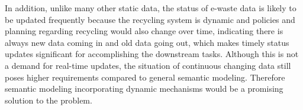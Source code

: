\documentclass{article}
\numberwithin{equation}{section}
\begin{document}
In addition, unlike many other static data, the status of e-waste data is likely to be updated frequently because the recycling system is dynamic and policies and planning regarding recycling would also change over time, indicating there is always new data coming in and old data going out, which makes timely status updates significant for accomplishing the downstream tasks. Although this is not a demand for real-time updates, the situation of continuous changing data still poses higher requirements compared to general semantic modeling. Therefore semantic modeling incorporating dynamic mechanisms would be a promising solution to the problem.\\

\end{document}
